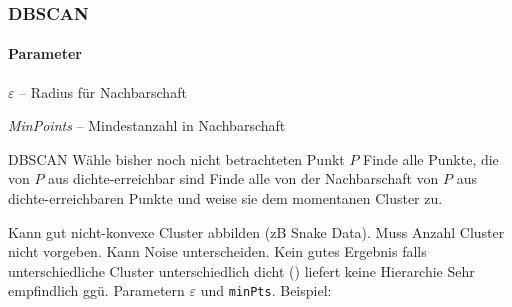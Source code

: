 \documentclass[10pt]{article} %
\begin{document}




\subsubsection{DBSCAN}

\paragraph{Parameter}
\begin{cptitemize} 
      \item $\varepsilon$ -- Radius für Nachbarschaft
      \item \textit{MinPoints} -- Mindestanzahl in Nachbarschaft
 \end{cptitemize} 

\begin{myalgo}{DBSCAN}
   Wähle bisher noch nicht betrachteten Punkt $P$ \;
   Finde alle Punkte, die von $P$ aus dichte-erreichbar sind \;
   Finde alle von der Nachbarschaft von $P$ aus dichte-erreichbaren Punkte und weise sie dem momentanen Cluster zu. \;
\end{myalgo}

\begin{itemize} 
   \advantageit Kann gut nicht-konvexe Cluster abbilden (zB Snake Data).
   \advantageit Muss Anzahl Cluster nicht vorgeben.
   \advantageit Kann Noise unterscheiden.
   \disadvantageit Kein gutes Ergebnis falls unterschiedliche Cluster unterschiedlich dicht ()
   \disadvantageit liefert keine Hierarchie
   \disadvantageit Sehr empfindlich ggü. Parametern $\varepsilon$ und \lstinline$minPts$. Beispiel: 
\end{itemize} 
\end{document}
